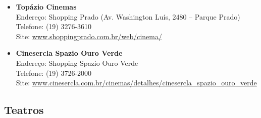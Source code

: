 \begin{itemize}
    \item   \textbf{Topázio Cinemas}
		\\Endereço: Shopping Prado (Av. Washington Luís, 2480 -- Parque Prado)
		\\Telefone: (19) 3276-3610
		\\Site: \url{www.shoppingprado.com.br/web/cinema/}

    \item   \textbf{Cinesercla Spazio Ouro Verde}
		\\Endereço: Shopping Spazio Ouro Verde 
		\\Telefone: (19) 3726-2000
		\\Site: \url{www.cinesercla.com.br/cinemas/detalhes/cinesercla_spazio_ouro_verde}
\end{itemize}

\subsection{Teatros}


